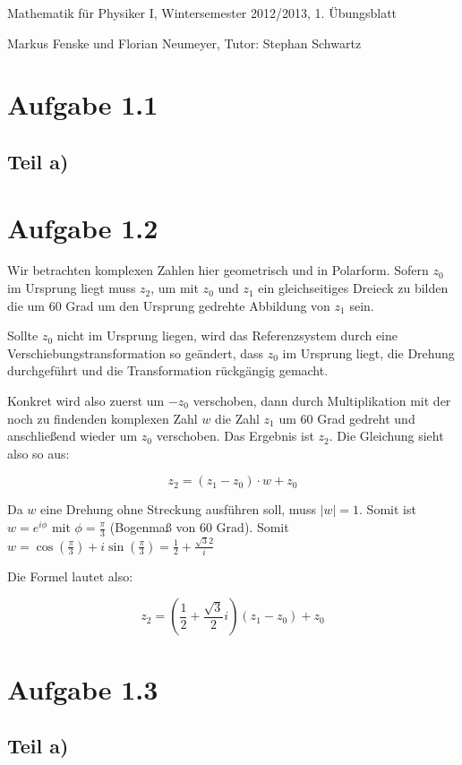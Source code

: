 \documentclass[a4paper,german,12pt]{article}
\begin{document}
Mathematik für Physiker I, Wintersemester 2012/2013, 1. Übungsblatt

Markus Fenske und Florian Neumeyer, Tutor: Stephan Schwartz

\section*{Aufgabe 1.1}
\subsection*{Teil a)}

\section*{Aufgabe 1.2}

Wir betrachten komplexen Zahlen hier geometrisch und in Polarform. Sofern $z_0$
im Ursprung liegt muss $z_2$, um mit $z_0$ und $z_1$ ein gleichseitiges Dreieck
zu bilden die um 60 Grad um den Ursprung gedrehte Abbildung von $z_1$ sein.

Sollte $z_0$ nicht im Ursprung liegen, wird das Referenzsystem durch eine
Verschiebungstransformation so geändert, dass $z_0$ im Ursprung liegt, die
Drehung durchgeführt und die Transformation rückgängig gemacht.

Konkret wird also zuerst um $-z_0$ verschoben, dann durch Multiplikation mit
der noch zu findenden komplexen Zahl $w$ die Zahl $z_1$ um 60 Grad gedreht und
anschließend wieder um $z_0$ verschoben. Das Ergebnis ist $z_2$. Die Gleichung
sieht also so aus:

$$z_2 = (z_1 - z_0) \cdot w + z_0$$

Da $w$ eine Drehung ohne Streckung ausführen soll, muss $|w| = 1$. Somit ist $w
= e^{i\phi}$ mit $\phi = \frac{\pi}{3}$ (Bogenmaß von 60 Grad). Somit $w =
\cos(\frac{\pi}{3}) + i\sin(\frac{\pi}{3}) = \frac{1}{2} +
\frac{\sqrt{3}{2}}i$

Die Formel lautet also:

$$z_2 = \left(\frac{1}{2} + \frac{\sqrt{3}}{2}i\right) \left(z_1 - z_0\right)  + z_0$$

\section*{Aufgabe 1.3}
\subsection*{Teil a)}
\end{document}
